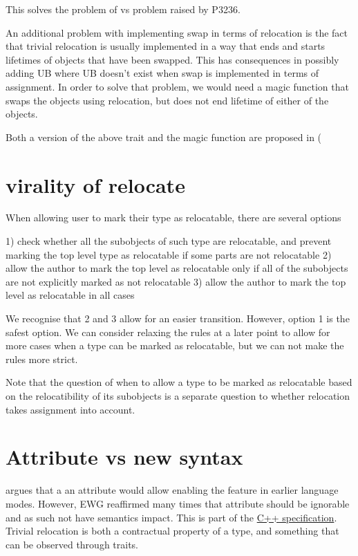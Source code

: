 \documentclass{wg21}
\begin{document}
This solves the problem of  vs  problem raised by P3236.

An additional problem with implementing swap in terms of relocation is the fact that trivial relocation is usually implemented in a way that ends and starts lifetimes of objects that have been swapped. This has consequences in possibly adding UB where UB doesn't exist when swap is implemented in terms of assignment. In order to solve that problem, we would need a magic function that swaps the objects using relocation, but does not end lifetime of either of the objects.

Both a version of the above trait and the magic function are proposed in (%


\section{virality of relocate}

When allowing user to mark their type as relocatable, there are several options

1) check whether all the subobjects of such type are relocatable, and prevent marking the top level type as relocatable if some parts are not relocatable
2) allow the author to mark the top level as relocatable only if all of the subobjects are not explicitly marked as not relocatable
3) allow the author to mark the top level as relocatable in all cases

We recognise that 2 and 3 allow for an easier transition. However, option 1 is the safest option. We can consider relaxing the rules at a later point to allow for more cases when a type can be marked as relocatable, but we can not make the rules more strict.

Note that the question of when to allow a type to be marked as relocatable based on the relocatibility of its subobjects is a separate question to whether relocation takes assignment into account.

\section{Attribute vs new syntax}

 argues that a an attribute would allow enabling the feature in earlier language modes.
However, EWG reaffirmed many times that attribute should be ignorable and as such not have semantics impact.
This is part of the \href{https://eel.is/c++draft/dcl.attr#grammar-note-5}{C++ specification}.
Trivial relocation is both a contractual property of a type, and something that can be observed through traits.
\end{document}
